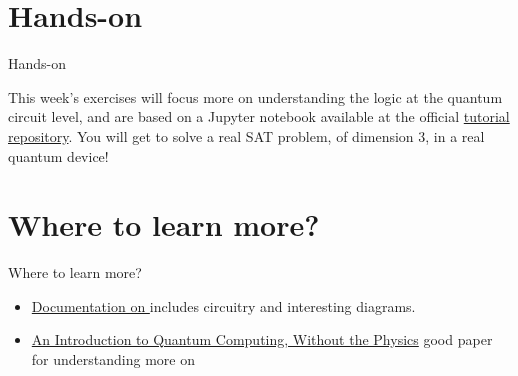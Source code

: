 \documentclass[aspectratio=43]{beamer}
\begin{document}
\section{Hands-on}
\begin{frame}{Hands-on}
    \begin{card}
        This week's exercises will focus more on understanding the logic at the quantum circuit level, and are based on a Jupyter notebook available at the official \href{https://github.com/Qiskit/qiskit-tutorial}{\qk tutorial repository}. You will get to solve a real SAT problem, of dimension 3, in a real quantum device!
    \end{card}
\pagenumber
\end{frame}

\section{Where to learn more?}
\begin{frame}{Where to learn more?}
\begin{card}
    \begin{itemize}
        \item \href{https://quantumexperience.ng.bluemix.net/proxy/tutorial/full-user-guide/004-Quantum_Algorithms/070-Grover's_Algorithm.html}{\ibmqe Documentation on \gv} includes circuitry and interesting diagrams.
        \item \href{https://arxiv.org/abs/1708.03684}{An Introduction to Quantum Computing, Without the Physics} good paper for understanding more on \gvsa
    \end{itemize}
\end{card}
\end{frame}
\end{document}
